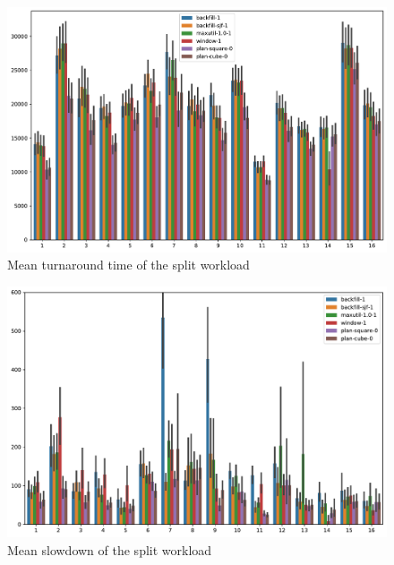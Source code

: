 \documentclass[thesis-en.tex]{subfiles}
\begin{document}
\begin{figure}[p]
    \centering
    \includegraphics[width=\textwidth]{best_io-aware_parts_turnaround-time.pdf}
    \caption{Mean turnaround time of the split workload}
    \label{fig:best_io-aware_parts_turnaround-time}
\end{figure}

\begin{figure}[p]
    \centering
    \includegraphics[width=\textwidth]{best_io-aware_parts_slowdown.pdf}
    \caption{Mean slowdown of the split workload}
    \label{fig:best_io-aware_parts_slowdown}
\end{figure}
\end{document}

